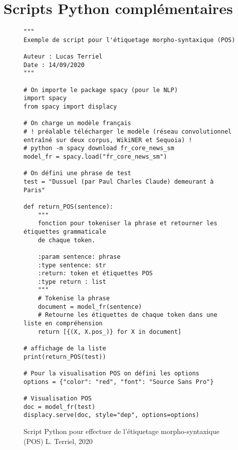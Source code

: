 \chapter{Scripts Python complémentaires}
\begin{figure}[h]
\lstset{language=Python}
\begin{lstlisting}
"""
Exemple de script pour l'étiquetage morpho-syntaxique (POS)

Auteur : Lucas Terriel
Date : 14/09/2020
"""

# On importe le package spacy (pour le NLP)
import spacy
from spacy import displacy

# On charge un modèle français
# ! préalable télécharger le modèle (réseau convolutionnel entraîné sur deux corpus, WikiNER et Sequoia) !
# python -m spacy download fr_core_news_sm
model_fr = spacy.load("fr_core_news_sm")

# On défini une phrase de test
test = "Dussuel (par Paul Charles Claude) demeurant à Paris"

def return_POS(sentence):
    """
    fonction pour tokeniser la phrase et retourner les étiquettes grammaticale
    de chaque token.

    :param sentence: phrase
    :type sentence: str
    :return: token et étiquettes POS
    :type return : list
    """
    # Tokenise la phrase
    document = model_fr(sentence)
    # Retourne les étiquettes de chaque token dans une liste en compréhension
    return [{(X, X.pos_)} for X in document]

# affichage de la liste
print(return_POS(test))

# Pour la visualisation POS on défini les options
options = {"color": "red", "font": "Source Sans Pro"}

# Visualisation POS
doc = model_fr(test)
displacy.serve(doc, style="dep", options=options)

\end{lstlisting}
\caption{Script Python pour effectuer de l'étiquetage morpho-syntaxique (POS) \textcopyright L. Terriel, 2020}
\label{fig:script_python_POS}
\end{figure}
